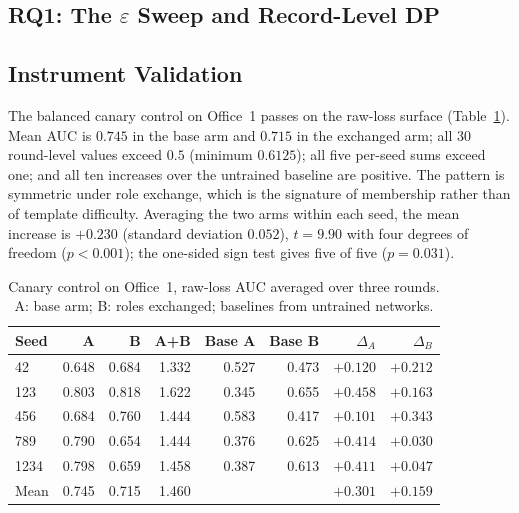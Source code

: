 \subsection{RQ1: The \texorpdfstring{$\varepsilon$}{eps} Sweep and Record-Level DP}
\label{sec:results-rq1}



\subsection{Instrument Validation}
\label{sec:results-canary}

The balanced canary control on Office~1 passes on the raw-loss surface
(Table~\ref{tab:canary}). Mean AUC is $0.745$ in the base arm and $0.715$ in
the exchanged arm; all 30 round-level values exceed $0.5$ (minimum $0.6125$);
all five per-seed sums exceed one; and all ten increases over the untrained
baseline are positive. The pattern is symmetric under role exchange, which is
the signature of membership rather than of template difficulty. Averaging the
two arms within each seed, the mean increase is $+0.230$ (standard deviation
$0.052$), $t = 9.90$ with four degrees of freedom ($p < 0.001$); the one-sided
sign test gives five of five ($p = 0.031$).

\begin{table}[t]
\centering
\caption{Canary control on Office~1, raw-loss AUC averaged over three rounds.
A: base arm; B: roles exchanged; baselines from untrained networks.}
\label{tab:canary}
\footnotesize
\setlength{\tabcolsep}{3.5pt}
\begin{tabular}{@{}lrrrrrrr@{}}
\toprule
Seed & A & B & A+B & Base A & Base B & $\Delta_A$ & $\Delta_B$ \\
\midrule
42   & 0.648 & 0.684 & 1.332 & 0.527 & 0.473 & $+0.120$ & $+0.212$ \\
123  & 0.803 & 0.818 & 1.622 & 0.345 & 0.655 & $+0.458$ & $+0.163$ \\
456  & 0.684 & 0.760 & 1.444 & 0.583 & 0.417 & $+0.101$ & $+0.343$ \\
789  & 0.790 & 0.654 & 1.444 & 0.376 & 0.625 & $+0.414$ & $+0.030$ \\
1234 & 0.798 & 0.659 & 1.458 & 0.387 & 0.613 & $+0.411$ & $+0.047$ \\
\midrule
Mean & 0.745 & 0.715 & 1.460 &  &  & $+0.301$ & $+0.159$ \\
\bottomrule
\end{tabular}
\end{table}

